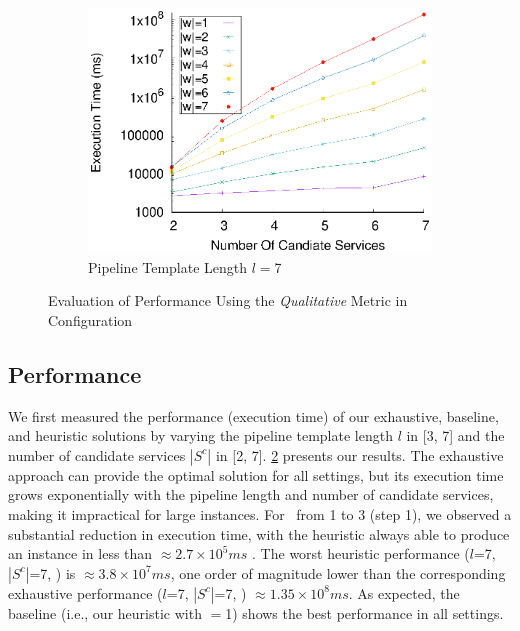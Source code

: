 \begin{figure}[!ht]
      \begin{subfigure}{0.45\textwidth}
        \includegraphics[width=\textwidth]{Images/graphs/window_time_performance_qualitative_n7_s7_50_80_n7}
        \caption{Pipeline Template Length $l$$=$7}
        \label{fig:time_window_perce_wide_7n}
      \end{subfigure}
      \caption{{\color{OurColor2}Evaluation of Performance Using the \emph{Qualitative} Metric in Configuration \average}}
      \label{fig:time_window_perce_average}
    \end{figure}
    \subsection{Performance}\label{subsec:experiments_performance}
    We first measured the performance (execution time) of our exhaustive, baseline, and heuristic solutions by varying the pipeline template length $l$ in [3, 7] and the number of candidate services $|S^c|$ in [2, 7]. \cref{fig:time_window_perce_average} presents our results.
    The exhaustive approach can provide the optimal solution for all settings, but its execution time grows exponentially with the pipeline length and number of candidate services, making it impractical for large instances. For \windowsize\ from 1 to 3 (step 1), we observed a substantial reduction in execution time, with the heuristic always able to produce an instance in less than $\approx2.7\times10^5ms$ . The worst heuristic performance ($l$=7, $|S^c|$=7, ) is $\approx3.8\times10^7ms$, one order of magnitude lower than the corresponding exhaustive performance ($l$=7, $|S^c|$=7, ) $\approx1.35\times10^8ms$. {\color{OurColor} As expected, the baseline (i.e., our heuristic with \windowsize$=$1) shows the best performance in all settings.}


